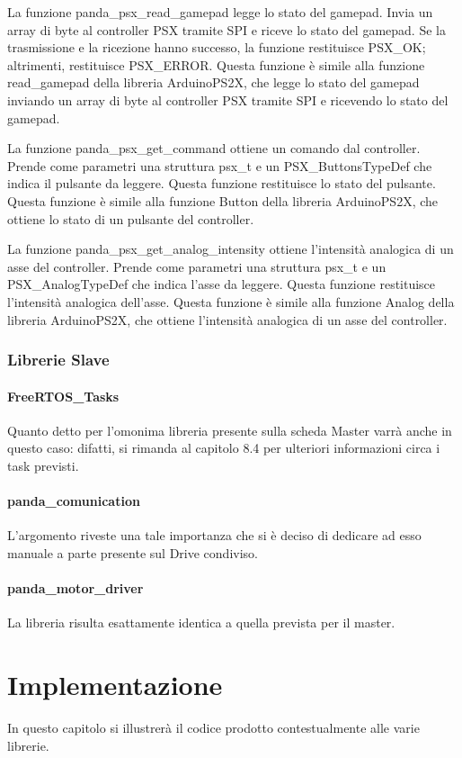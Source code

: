 \documentclass{article}
\begin{document}
          La funzione panda\_psx\_read\_gamepad legge lo stato del gamepad. Invia un array di byte al controller PSX tramite SPI e riceve lo stato del gamepad. Se la trasmissione e la ricezione hanno successo, la funzione restituisce PSX\_OK; altrimenti, restituisce PSX\_ERROR. Questa funzione è simile alla funzione read\_gamepad della libreria Arduino\-PS2X, che legge lo stato del gamepad inviando un array di byte al controller PSX tramite SPI e ricevendo lo stato del gamepad.
          
          La funzione panda\_psx\_get\_command ottiene un comando dal controller. Prende come parametri una struttura psx\_t e un PSX\_ButtonsTypeDef che indica il pulsante da leggere. Questa funzione restituisce lo stato del pulsante. Questa funzione è simile alla funzione Button della libreria Arduino\-PS2X, che ottiene lo stato di un pulsante del controller.
          
          La funzione panda\_psx\_get\_analog\_intensity ottiene l’intensità analogica di un asse del controller. Prende come parametri una struttura psx\_t e un PSX\_AnalogTypeDef che indica l’asse da leggere. Questa funzione restituisce l’intensità analogica dell’asse. Questa funzione è simile alla funzione Analog della libreria Arduino\-PS2X, che ottiene l’intensità analogica di un asse del controller.
        \subsubsection{Librerie Slave}
          \paragraph{FreeRTOS\_Tasks} Quanto detto per l'omonima libreria presente sulla scheda Master varrà anche in questo caso: difatti, si rimanda al capitolo 8.4 per ulteriori informazioni circa i task previsti. 
          \paragraph{panda\_comunication} L'argomento riveste una tale importanza che si è deciso di dedicare ad esso manuale a parte presente sul Drive condiviso. 
          \paragraph{panda\_motor\_driver} La libreria risulta esattamente identica a quella prevista per il master.
  \section{Implementazione}
    In questo capitolo si illustrerà il codice prodotto contestualmente alle varie librerie. 
\end{document}
